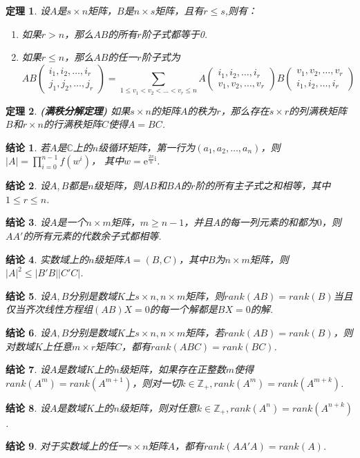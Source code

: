 \documentclass[UTF8]{article}
\newtheorem{thrm}{定理}[subsection]
\newtheorem{ccl}{结论}[subsection]
\begin{document}
\begin{thrm}
  设$A$是$s\times n$矩阵，$B$是$n\times s$矩阵，且有$r\le s$,则有：
  \begin{enumerate}
    \item 如果$r>n$，那么$AB$的所有$r$阶子式都等于0.
    \item 如果$r\le n$，那么$AB$的任一$r$阶子式为$$ AB\begin{pmatrix} i_1,i_2,\ldots,i_r\\j_1,j_2,\ldots,j_r \end{pmatrix}=
    \sum\limits_{1\le v_1<v_2<\ldots<v_r\le n}A\begin{pmatrix}i_1,i_2,\ldots,i_r\\v_1,v_2,\ldots,v_r \end{pmatrix}
    B\begin{pmatrix}v_1,v_2,\ldots,v_r\\i_1,i_2,\ldots,i_r \end{pmatrix}$$
  \end{enumerate}
\end{thrm}
\begin{thrm}
  \textbf{(满秩分解定理) }如果$s\times n$的矩阵$A$的秩为$r$，那么存在$s\times r$的列满秩矩阵$B$和$r\times n$的行满秩矩阵$C$使得$A=BC$.
\end{thrm}
\begin{ccl}
  若$A$是$\mathbb{C}$上的$n$级循环矩阵，第一行为$(a_1,a_2,\ldots,a_n)$，则$|A|=\prod\limits_{i=0}^{n-1}f(w^i)$，
  其中$w=\mathrm{e}^{\frac{2\pi}{n}\mathrm{i}}$.
\end{ccl}
\begin{ccl}
  设$A,B$都是$n$级矩阵，则$AB$和$BA$的$r$阶的所有主子式之和相等，其中$1\le r\le n$.
\end{ccl}
\begin{ccl}
  设$A$是一个$n\times m$矩阵，$m\ge n-1$，并且$A$的每一列元素的和都为$0$，则$AA'$的所有元素的代数余子式都相等.
\end{ccl}
\begin{ccl}
  实数域上的$n$级矩阵$A=(B,C)$，其中$B$为$n\times m$矩阵，则$|A|^2\le |B'B||C'C|$.
\end{ccl}
\begin{ccl}
  设$A,B$分别是数域$K$上$s\times n,n\times m$矩阵，则$rank(AB)=rank(B)$当且仅当齐次线性方程组$(AB)X=0$的每一个解都是$BX=0$的解.
\end{ccl}
\begin{ccl}
  设$A,B$分别是数域$K$上$s\times n,n\times m$矩阵，若$rank(AB)=rank(B)$，则对数域$K$上任意$m\times r$矩阵$C$，都有$rank(ABC)=rank(BC)$.
\end{ccl}
\begin{ccl}
  设$A$是数域$K$上的$n$级矩阵，如果存在正整数$m$使得$rank(A^m)=rank(A^{m+1})$，则对一切$k\in \mathbb{Z_+},rank(A^m)=rank(A^{m+k})$.
\end{ccl}
\begin{ccl}
  设$A$是数域$K$上的$n$级矩阵，则对任意$k\in \mathbb{Z_+},rank(A^n)=rank(A^{n+k})$.
\end{ccl}
\begin{ccl}
  对于实数域上的任一$s\times n$矩阵$A$，都有$rank(AA'A)=rank(A)$.
\end{ccl}
\end{document}
